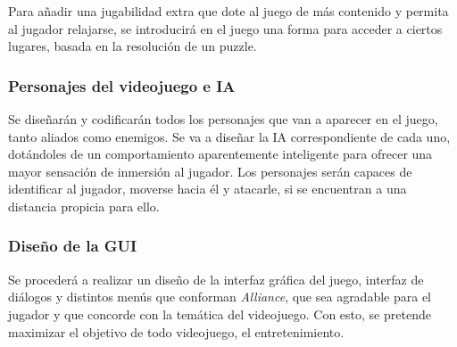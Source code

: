 Para añadir una jugabilidad extra que dote al juego de más contenido y permita al jugador relajarse, se introducirá en el juego una forma para acceder a ciertos lugares, basada en la resolución de un puzzle. 

\subsubsection{Personajes del videojuego e \ac{IA}}

Se diseñarán y codificarán todos los personajes que van a aparecer en el juego, tanto aliados como enemigos. Se va a diseñar la \ac{IA} correspondiente de cada uno, dotándoles de un comportamiento aparentemente inteligente para ofrecer una mayor sensación de inmersión al jugador. Los personajes serán capaces de identificar al jugador, moverse hacia él y atacarle, si se encuentran a una distancia propicia para ello.

\pagestyle{notsection}

\subsubsection{Diseño de la \ac{GUI}}

Se procederá a realizar un diseño de la interfaz gráfica del juego, interfaz de diálogos y distintos menús que conforman \textit{Alliance}, que sea agradable para el jugador y que concorde con la temática del videojuego. Con esto, se pretende maximizar el objetivo de todo videojuego, el entretenimiento.
